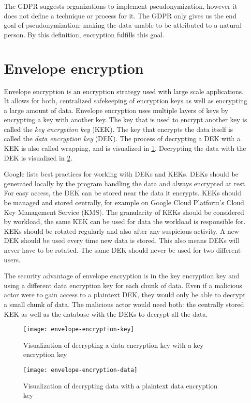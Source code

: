 The GDPR suggests organizations to implement pseudonymization, however it does not define a technique or process for it.
The GDPR only gives us the end goal of pseudonymization: making the data unable to be attributed to a natural person.
By this definition, encryption fulfills this goal.
\cite{pseudonymisation}

%

\section{Envelope encryption}

Envelope encryption is an encryption strategy used with large scale applications.
It allows for both, centralized safekeeping of encryption keys as well as encrypting a large amount of data.
Envelope encryption uses multiple layers of keys by encrypting a key with another key.
The key that is used to encrypt another key is called the \textit{key encryption key} (KEK).
The key that encrypts the data itself is called the \textit{data encryption key} (DEK).
The process of decrypting a DEK with a KEK is also called wrapping, and is visualized in \ref{fig:envelope-encryption-key}.
Decrypting the data with the DEK is visualized in \ref{fig:envelope-encryption-data}.
\cite{googlecloud}

Google lists best practices for working with DEKs and KEKs.
DEKs should be generated locally by the program handling the data and always encrypted at rest.
For easy access, the DEK can be stored near the data it encrypts.
KEKs should be managed and stored centrally, for example on Google Cloud Platform's Cloud Key Management Service (KMS).
The granularity of KEKs should be considered by workload, the same KEK can be used for data the workload is responsible for.
KEKs should be rotated regularly and also after any suspicious activity.
A new DEK should be used every time new data is stored.
This also means DEKs will never have to be rotated.
The same DEK should never be used for two different users.
\cite{googlecloud}

The security advantage of envelope encryption is in the key encryption key and using a different data encryption key for each chunk of data.
Even if a malicious actor were to gain access to a plaintext DEK, they would only be able to decrypt a small chunk of data.
The malicious actor would need both: the centrally stored KEK as well as the database with the DEKs to decrypt all the data.
\cite{googlecloud}

\begin{figure}[!htb]
\centering
\texttt{[image: envelope-encryption-key]}
\caption{Visualization of decrypting a data encryption key with a key encryption key}
\label{fig:envelope-encryption-key}
\end{figure}

\begin{figure}[!htb]
\centering
\texttt{[image: envelope-encryption-data]}
\caption{Visualization of decrypting data with a plaintext data encryption key}
\label{fig:envelope-encryption-data}
\end{figure}